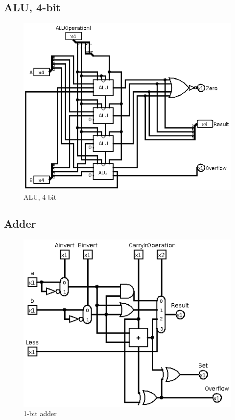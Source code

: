 \documentclass[10pt,a4paper,danish]{article}
\begin{document}
\subsection{ALU, 4-bit}
\begin{figure}[htb]
\begin{center}
\leavevmode
\includegraphics[scale=0.70]{circ2.png}
\end{center}
\caption{ALU, 4-bit}
\label{fig:circ2}
\end{figure}

\subsection{Adder}
\begin{figure}[htb]
\begin{center}
\leavevmode
\includegraphics[scale=0.70]{adder-1bit.png}
\end{center}
\caption{1-bit adder}
\label{fig:adder}
\end{figure}
\end{document}
